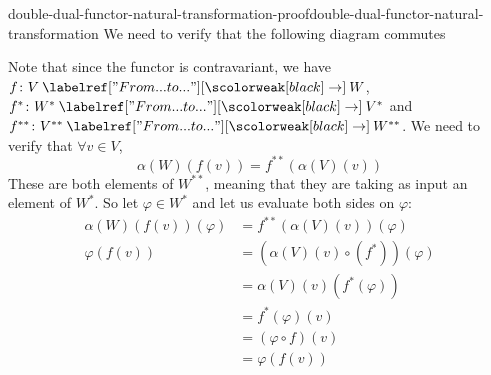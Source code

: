 \documentclass[preview]{standalone}
\begin{document}
\begin{snippetproof}{double-dual-functor-natural-transformation-proof}{double-dual-functor-natural-transformation}{}
    We need to verify that the following diagram commutes
    \begin{center}
    \end{center}
    Note that since the functor is contravariant, we have
    \(f\colon V \fromto W\), \(f^* \colon W^* \fromto V^*\)
    and \(f^{**} \colon V^{**} \fromto W^{**}\).
    We need to verify that \(\forall v \in V\),
    \[
        \alpha(W)(f(v)) = f^{**}(\alpha(V)(v))
    \]
    These are both elements of \(W^{**}\), meaning that they are \function[functions]
    taking as input an element of \(W^*\). So let \(\varphi \in W^*\)
    and let us evaluate both sides on \(\varphi\):
    \begin{align*}
        \alpha(W)(f(v))(\varphi) &= f^{**}(\alpha(V)(v))(\varphi) \\
        \varphi(f(v)) &= (\alpha(V)(v) \circ (f^*))(\varphi) \\
        &= \alpha(V)(v) (f^*(\varphi)) \\
        &= f^*(\varphi)(v) \\
        &= (\varphi \circ f)(v) \\
        &= \varphi(f(v))
    \end{align*}
\end{snippetproof}
\end{document}
